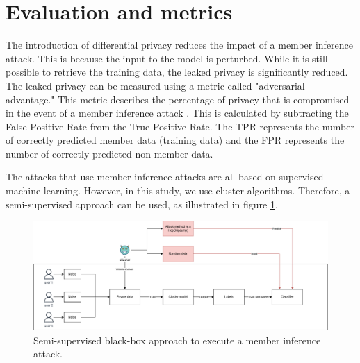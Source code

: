 



\section{Evaluation and metrics}
The introduction of differential privacy reduces the impact of a member inference attack. This is because the input to the model is perturbed. While it is still possible to retrieve the training data, the leaked privacy is significantly reduced.
The leaked privacy can be measured using a metric called "adversarial advantage." This metric describes the percentage of privacy that is compromised in the event of a member inference attack \citep{yeom_privacy_2018}.
This is calculated by subtracting the False Positive Rate from the True Positive Rate. The TPR represents the number of correctly predicted member data (training data) and the FPR represents the number of correctly predicted non-member data. \newline

The attacks that use member inference attacks are all based on supervised machine learning.
However, in this study, we use cluster algorithms.
Therefore, a semi-supervised approach can be used, as illustrated in figure \ref{figure:MIA-semi-supervised}.

\begin{figure}[h]
  \label{figure:MIA-semi-supervised}
  \includegraphics[width=1\textwidth]{TheorethicalFramework/Differential privacy/master-thesis-MIA.png}
  \caption{Semi-supervised black-box approach to execute a member inference attack.}
\end{figure}